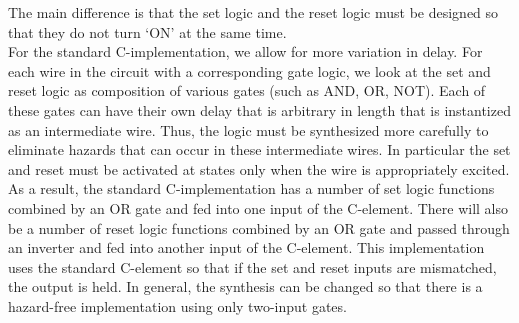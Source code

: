 \documentclass[12pt]{report}
\begin{document}
The main difference is that the set logic and the reset logic must be designed so that they do not turn `ON' at the same time.\\

For the standard C-implementation, we allow for more variation in delay. For each wire in the circuit with a corresponding gate logic, we look at the set and reset logic as composition of various gates (such as AND, OR, NOT). Each of these gates can have their own delay that is arbitrary in length that is instantized as an intermediate wire. Thus, the logic must be synthesized more carefully to eliminate hazards that can occur in these intermediate wires. In particular the set and reset must be activated at states only when the wire is appropriately excited. As a result, the standard C-implementation has a number of set logic functions combined by an OR gate and fed into one input of the C-element. There will also be a number of reset logic functions combined by an OR gate and passed through an inverter and fed into another input of the C-element. This implementation uses the standard C-element so that if the set and reset inputs are mismatched, the output is held. In general, the synthesis can be changed so that there is a hazard-free implementation using only two-input gates.
\end{document}
